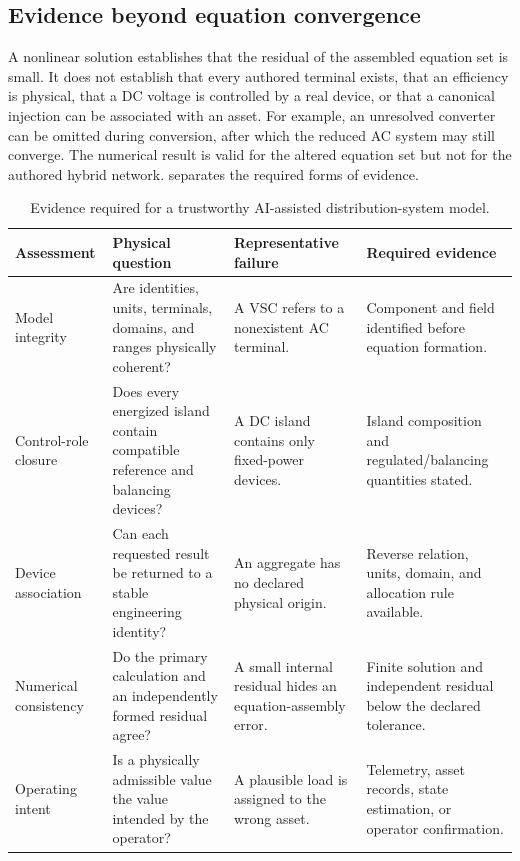 \documentclass[final,5p,times,twocolumn]{elsarticle}
\begin{document}
\subsection{Evidence beyond equation convergence}

A nonlinear solution establishes that the residual of the assembled equation
set is small. It does not establish that every authored terminal exists, that
an efficiency is physical, that a DC voltage is controlled by a real device, or
that a canonical injection can be associated with an asset. For example, an
unresolved converter can be omitted during conversion, after which the reduced
AC system may still converge. The numerical result is valid for the altered
equation set but not for the authored hybrid network. 
separates the required forms of evidence.

\begin{table}[t]
\centering
\caption{Evidence required for a trustworthy AI-assisted distribution-system model.}
\label{tab:trust-layers}
\small
\begin{tabularx}{\textwidth}{@{}p{}p{}p{}X@{}}
\toprule
Assessment & Physical question & Representative failure & Required evidence \\
\midrule
Model integrity & Are identities, units, terminals, domains, and ranges physically coherent? & A VSC refers to a nonexistent AC terminal. & Component and field identified before equation formation. \\
Control-role closure & Does every energized island contain compatible reference and balancing devices? & A DC island contains only fixed-power devices. & Island composition and regulated/balancing quantities stated. \\
Device association & Can each requested result be returned to a stable engineering identity? & An aggregate has no declared physical origin. & Reverse relation, units, domain, and allocation rule available. \\
Numerical consistency & Do the primary calculation and an independently formed residual agree? & A small internal residual hides an equation-assembly error. & Finite solution and independent residual below the declared tolerance. \\
Operating intent & Is a physically admissible value the value intended by the operator? & A plausible load is assigned to the wrong asset. & Telemetry, asset records, state estimation, or operator confirmation. \\
\bottomrule
\end{tabularx}
\end{table}
\end{document}

